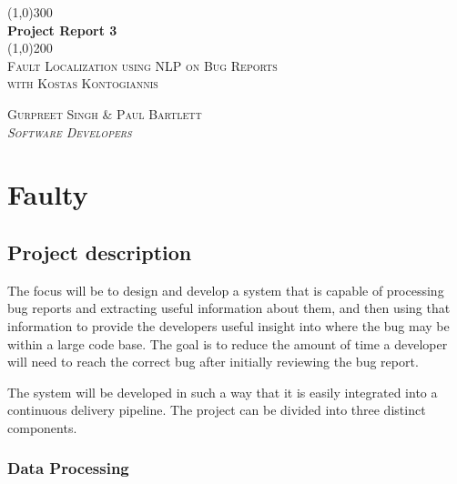 \documentclass[11pt,]{article}
\begin{document}
\doublespacing

\begin{titlepage}
    \begin{center}
    \line(1,0){300} \\ 
    [0.25in]
    \huge{\bfseries Project Report 3} \\
    [2mm]
    \line(1,0){200} \\
    [1.5cm] 
    \textsc{\Large Fault Localization using NLP on Bug Reports} \\
    [0.75cm]
    \textsc{\Large with Kostas Kontogiannis} \\
    [10cm]
    \end{center}
    
    \begin{flushright}
    \textsc{\Large{Gurpreet Singh \& Paul Bartlett \\} \normalsize\emph{Software Developers \\} }
    
    \end{flushright}
    
\end{titlepage}


\newpage

{
\hypersetup{linkcolor=black}
\setcounter{tocdepth}{2}
\tableofcontents
\newpage
}
\hypertarget{faulty}{%
\section{Faulty}\label{faulty}}

\hypertarget{project-description}{%
\subsection{Project description}\label{project-description}}

The focus will be to design and develop a system that is capable of
processing bug reports and extracting useful information about them, and
then using that information to provide the developers useful insight
into where the bug may be within a large code base. The goal is to
reduce the amount of time a developer will need to reach the correct bug
after initially reviewing the bug report.

The system will be developed in such a way that it is easily integrated
into a continuous delivery pipeline. The project can be divided into
three distinct components.

\hypertarget{data-processing}{%
\subsubsection{Data Processing}\label{data-processing}}
\end{document}
